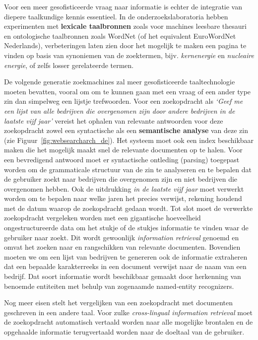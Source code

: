 \begin{multicols}{2}
    Voor een meer gesofisticeerde vraag naar informatie is echter de integratie van diepere taalkundige kennis essentieel. In de onderzoekslaboratoria hebben experimenten met \textbf{lexicale taalbronnen} zoals voor machines leesbare thesauri en ontologische taalbronnen zoals WordNet (of het equivalent EuroWordNet Nederlands), verbeteringen laten zien door het mogelijk te maken een pagina te vinden op basis van synoniemen van de zoektermen, bijv. \emph{kernenergie} en \emph{nucleaire energie}, of zelfs losser gerelateerde termen.


    De volgende generatie zoekmachines zal meer gesofisticeerde taaltechnologie moeten bevatten, vooral om om te kunnen gaan met een vraag of een ander type zin dan simpelweg een lijstje trefwoorden. Voor een zoekopdracht als \emph{`Geef me een lijst van alle bedrijven die overgenomen zijn door andere bedrijven in de laatste vijf jaar'}  vereist het ophalen van relevante antwoorden voor deze zoekopdracht zowel een syntactische als een \textbf{semantische  analyse} van deze zin  (zie Figuur~\ref{fig:websearcharch_de}). Het systeem  moet ook  een index beschikbaar maken die het mogelijk maakt snel de relevante documenten op te halen.  Voor een bevredigend antwoord moet er syntactische ontleding (parsing) toegepast worden om de grammaticale structuur van de zin te analyseren en te bepalen dat de gebruiker zoekt naar bedrijven die overgenomen zijn en niet bedrijven die overgenomen hebben. Ook de uitdrukking \emph{in de laatste vijf jaar} moet verwerkt worden om te bepalen naar welke jaren het precies verwijst, rekening houdend met de datum waarop de zoekopdracht gedaan wordt.     Tot slot moet de verwerkte zoekopdracht vergeleken worden met een gigantische hoeveelheid ongestructureerde data om het stukje of de stukjes informatie te vinden waar de gebruiker naar zoekt. Dit wordt gewoonlijk \emph{information retrieval} genoemd en omvat het zoeken naar en rangschikken van relevante documenten. Bovendien moeten we om een lijst van bedrijven te genereren ook de informatie extraheren dat een bepaalde karakterreeks in een document verwijst naar de naam van een bedrijf. Dat soort informatie wordt beschikbaar gemaakt door herkenning van benoemde entiteiten met behulp van zogenaamde named-entity recognizers.

    Nog meer eisen stelt het vergelijken van een zoekopdracht  met documenten geschreven in een andere taal. Voor zulke \emph{cross-lingual information retrieval} moet  de zoekopdracht automatisch vertaald worden naar alle mogelijke brontalen en de opgehaalde informatie terugvertaald worden naar de doeltaal van de gebruiker.


\end{multicols}
